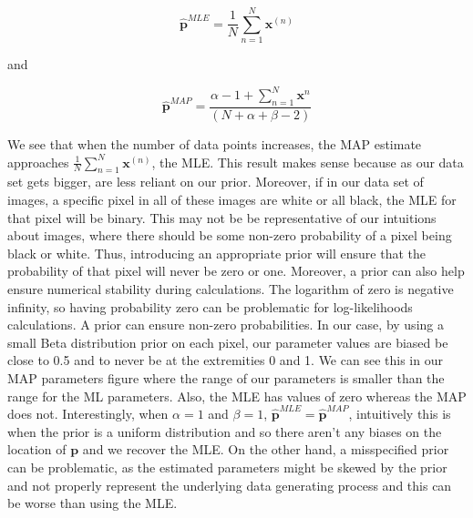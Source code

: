 \documentclass[12pt]{article}
\begin{document}
\begin{enumerate}
    $$\hat{\textbf{p}}^{MLE} = \frac{1}{N}\sum_{n=1}^{N} \textbf{x}^{(n)}$$

    and

    $$\hat{\textbf{p}}^{MAP}  =  \frac{\alpha - 1 +\sum_{n=1}^{N} \textbf{x}^n}{(N+\alpha+\beta-2)}$$


We see that when the number of data points increases, the MAP estimate approaches $\frac{1}{N}\sum_{n=1}^{N} \textbf{x}^{(n)}$, the MLE. This result makes sense because as our data set gets bigger, are less reliant on our prior.  Moreover, if in our data set of images, a specific pixel in all of these images are white or all black, the MLE for that pixel will be binary. This may not be be representative of our intuitions about images, where there should be some non-zero probability of a pixel being black or white. Thus, introducing an appropriate prior will ensure that the probability of that pixel will never be zero or one. Moreover, a prior can also help ensure numerical stability during calculations. The logarithm of zero is negative infinity, so having probability zero can be problematic for log-likelihoods calculations. A prior can ensure non-zero probabilities. In our case, by using a small Beta distribution prior on each pixel, our parameter values are biased be close to 0.5 and to never be at the extremities 0 and 1. We can see this in our MAP parameters figure where the range of our parameters is smaller than the range for the ML parameters. Also, the MLE has values of zero whereas the MAP does not. Interestingly, when $\alpha=1$ and $\beta=1$, $\hat{\textbf{p}}^{MLE} = \hat{\textbf{p}}^{MAP}$, intuitively this is when the prior is a uniform distribution and so there aren't any biases on the location of $\textbf{p}$ and we recover the MLE. On the other hand, a misspecified prior can be problematic, as the estimated parameters might be skewed by the prior and not properly represent the underlying data generating process and this can be worse than using the MLE.


\end{enumerate}
\end{document}
